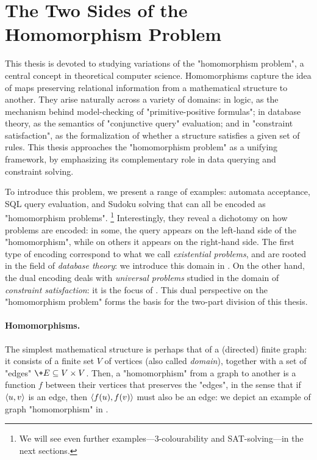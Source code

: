 \section{The Two Sides of the Homomorphism Problem}

This thesis is devoted to studying variations of the "homomorphism problem",
a central concept in theoretical computer science.
Homomorphisms capture the idea of maps preserving relational information from a mathematical structure to another.
They arise naturally across a variety of domains: in logic, as the mechanism behind model-checking of "primitive-positive formulas"; in database theory, as the semantics of "conjunctive query" evaluation; and in "constraint satisfaction", as the formalization of whether a structure
satisfies a given set of rules. This thesis approaches the "homomorphism problem" as a unifying framework, by emphasizing its complementary role in data querying and constraint solving.

To introduce this problem, we present a range of examples: automata acceptance, SQL query evaluation, and Sudoku solving that can all be encoded as "homomorphism problems".%
\footnote{We will see even further examples---3-colourability and SAT-solving---in the next sections.}
Interestingly, they reveal a dichotomy on how problems are encoded:
in some, the query appears on the left-hand side of the "homomorphism", 
while on others it appears on the right-hand side.
The first type of encoding correspond to what we call \emph{existential problems},
and are rooted in the field of \emph{database theory}:
we introduce this domain in .
On the other hand, the dual encoding deals with \emph{universal problems}
studied in the domain of \emph{constraint satisfaction}:
it is the focus of .
This dual perspective on the "homomorphism problem"
forms the basis for the two-part division of this thesis.

\paragraph*{Homomorphisms.}
The simplest mathematical structure is perhaps that of a (directed) finite graph:
it consists of a finite set $V$ of vertices (also called \emph{domain}),
together with a set of "edges" $\+E \subseteq V \times V$.
Then, a "homomorphism" from a graph to another is a
function $f$ between their vertices that preserves
the "edges", in the sense that if $\langle u,v\rangle$ is an edge, then
$\langle f(u),f(v)\rangle$ must also be an edge: we depict
an example of graph "homomorphism" in .


